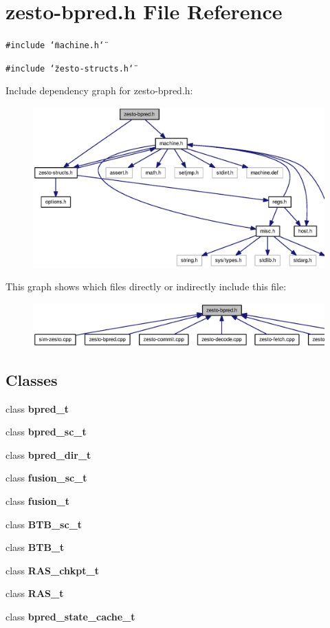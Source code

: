 \section{zesto-bpred.h File Reference}
\label{zesto-bpred_8h}
{\tt \#include \char`\"{}machine.h\char`\"{}}\par
{\tt \#include \char`\"{}zesto-structs.h\char`\"{}}\par


Include dependency graph for zesto-bpred.h:\nopagebreak
\begin{figure}[H]
\begin{center}
\leavevmode
\includegraphics[width=322pt]{zesto-bpred_8h__incl}
\end{center}
\end{figure}


This graph shows which files directly or indirectly include this file:\nopagebreak
\begin{figure}[H]
\begin{center}
\leavevmode
\includegraphics[width=385pt]{zesto-bpred_8h__dep__incl}
\end{center}
\end{figure}
\subsection*{Classes}
\begin{CompactItemize}
\item 
class {\bf bpred\_\-t}
\item 
class {\bf bpred\_\-sc\_\-t}
\item 
class {\bf bpred\_\-dir\_\-t}
\item 
class {\bf fusion\_\-sc\_\-t}
\item 
class {\bf fusion\_\-t}
\item 
class {\bf BTB\_\-sc\_\-t}
\item 
class {\bf BTB\_\-t}
\item 
class {\bf RAS\_\-chkpt\_\-t}
\item 
class {\bf RAS\_\-t}
\item 
class {\bf bpred\_\-state\_\-cache\_\-t}
\end{CompactItemize}
